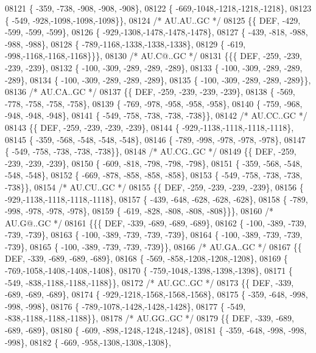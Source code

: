 \begin{DoxyCode}
08121 \{ -359, -738, -908, -908, -908\},
08122 \{ -669,-1048,-1218,-1218,-1218\},
08123 \{ -549, -928,-1098,-1098,-1098\}\},
08124 \textcolor{comment}{/* AU.AU..GC */}
08125 \{\{  DEF, -429, -599, -599, -599\},
08126 \{ -929,-1308,-1478,-1478,-1478\},
08127 \{ -439, -818, -988, -988, -988\},
08128 \{ -789,-1168,-1338,-1338,-1338\},
08129 \{ -619, -998,-1168,-1168,-1168\}\}\},
08130 \textcolor{comment}{/* AU.C@..GC */}
08131 \{\{\{  DEF, -259, -239, -239, -239\},
08132 \{ -100, -309, -289, -289, -289\},
08133 \{ -100, -309, -289, -289, -289\},
08134 \{ -100, -309, -289, -289, -289\},
08135 \{ -100, -309, -289, -289, -289\}\},
08136 \textcolor{comment}{/* AU.CA..GC */}
08137 \{\{  DEF, -259, -239, -239, -239\},
08138 \{ -569, -778, -758, -758, -758\},
08139 \{ -769, -978, -958, -958, -958\},
08140 \{ -759, -968, -948, -948, -948\},
08141 \{ -549, -758, -738, -738, -738\}\},
08142 \textcolor{comment}{/* AU.CC..GC */}
08143 \{\{  DEF, -259, -239, -239, -239\},
08144 \{ -929,-1138,-1118,-1118,-1118\},
08145 \{ -359, -568, -548, -548, -548\},
08146 \{ -789, -998, -978, -978, -978\},
08147 \{ -549, -758, -738, -738, -738\}\},
08148 \textcolor{comment}{/* AU.CG..GC */}
08149 \{\{  DEF, -259, -239, -239, -239\},
08150 \{ -609, -818, -798, -798, -798\},
08151 \{ -359, -568, -548, -548, -548\},
08152 \{ -669, -878, -858, -858, -858\},
08153 \{ -549, -758, -738, -738, -738\}\},
08154 \textcolor{comment}{/* AU.CU..GC */}
08155 \{\{  DEF, -259, -239, -239, -239\},
08156 \{ -929,-1138,-1118,-1118,-1118\},
08157 \{ -439, -648, -628, -628, -628\},
08158 \{ -789, -998, -978, -978, -978\},
08159 \{ -619, -828, -808, -808, -808\}\}\},
08160 \textcolor{comment}{/* AU.G@..GC */}
08161 \{\{\{  DEF, -339, -689, -689, -689\},
08162 \{ -100, -389, -739, -739, -739\},
08163 \{ -100, -389, -739, -739, -739\},
08164 \{ -100, -389, -739, -739, -739\},
08165 \{ -100, -389, -739, -739, -739\}\},
08166 \textcolor{comment}{/* AU.GA..GC */}
08167 \{\{  DEF, -339, -689, -689, -689\},
08168 \{ -569, -858,-1208,-1208,-1208\},
08169 \{ -769,-1058,-1408,-1408,-1408\},
08170 \{ -759,-1048,-1398,-1398,-1398\},
08171 \{ -549, -838,-1188,-1188,-1188\}\},
08172 \textcolor{comment}{/* AU.GC..GC */}
08173 \{\{  DEF, -339, -689, -689, -689\},
08174 \{ -929,-1218,-1568,-1568,-1568\},
08175 \{ -359, -648, -998, -998, -998\},
08176 \{ -789,-1078,-1428,-1428,-1428\},
08177 \{ -549, -838,-1188,-1188,-1188\}\},
08178 \textcolor{comment}{/* AU.GG..GC */}
08179 \{\{  DEF, -339, -689, -689, -689\},
08180 \{ -609, -898,-1248,-1248,-1248\},
08181 \{ -359, -648, -998, -998, -998\},
08182 \{ -669, -958,-1308,-1308,-1308\},

\end{DoxyCode}
